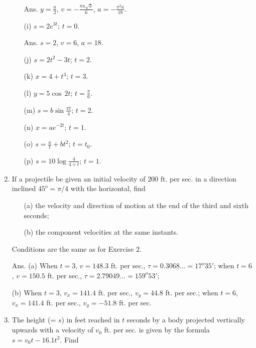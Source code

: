 \begin{enumerate}
\begin{itemize}
Ans. $y = \frac{a}{2}$, $v = -\frac{\pi a \sqrt{3}}{6}$, $a = -\frac{\pi^2 a}{18}$.

\item[(i)] 
$s = 2e^{3t}$; $t = 0$. 	

Ans. $s = 2$, $v = 6$, $a = 18$.

\item[(j)] 
$s = 2t^2 - 3t$; $t = 2$.

\item[(k)] 
$x = 4 + t^3$; $t = 3$.

\item[(l)] 
$y = 5 \cos\, 2t$; $t = \frac{\pi}{6}$.

\item[(m)] 
$s = b \sin \frac{\pi t}{4}$; $t = 2$.

\item[(n)] 
$x = ae^{- 2t}$; $t = 1$.

\item[(o)] 
$s = \frac{a}{t} + bt^2$; $t = t_0$.

\item[(p)] 
$s = 10 \log \frac{4}{4 + t}$; $t= 1$.

\end{itemize}

\item
 If a projectile be given an initial velocity of $200$ ft. per sec. 
in a direction inclined $45^o=\pi/4$ with the horizontal, find

\begin{itemize}
\item[(a)] 
the velocity and direction of motion at the end of the third and sixth seconds;

\item[(b)] 
the component velocities at the same instants.
\end{itemize}

Conditions are the same as for Exercise 2.

Ans. 	
\newline
(a) 	When $t = 3$, 	$v = 148.3$ ft. per sec., $\tau = 0.3068... = 17^o 35'$;
when $t = 6$, $v = 150.5$ ft. per sec., $\tau = 2.79049... = 159^o 53'$;

(b) When $t = 3$, $v_x = 141.4$ ft. per sec., $v_y = 44.8$ ft. per sec.;
when $t = 6$, $v_x = 141.4$ ft. per sec., $v_y = - 51.8$ ft. per sec.

\item
The height (= $s$) in feet reached in $t$ seconds by a body 
projected vertically upwards with a velocity of $v_0$ ft. per sec. 
is given by the formula
$    s = v_0t - 16.1t^2$.
Find 


\end{enumerate}
